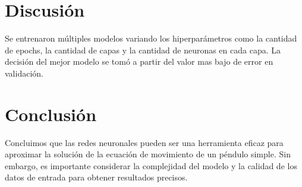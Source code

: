 \documentclass[a4paper,12pt]{article}
\begin{document}
\section{Discusión}
Se entrenaron múltiples modelos variando los hiperparámetros como la cantidad de epochs, la cantidad de capas y la cantidad de neuronas en cada capa. La decisión del mejor modelo se tomó a partir del valor mas bajo de error en validación.



\section{Conclusión}
Concluimos que las redes neuronales pueden ser una herramienta eficaz para aproximar la solución de la ecuación de movimiento de un péndulo simple. Sin embargo, es importante considerar la complejidad del modelo y la calidad de los datos de entrada para obtener resultados precisos.
\end{document}
